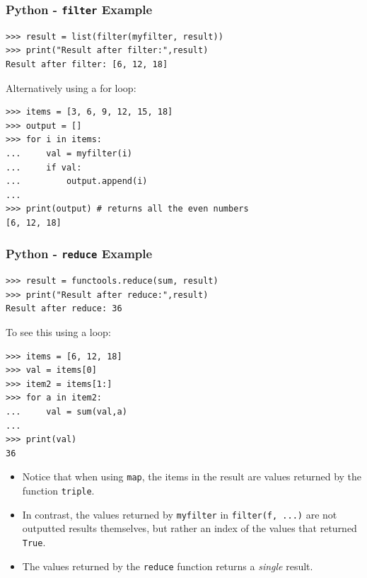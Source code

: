 \documentclass[xcolor=svgnames]{beamer}
\newcommand{\nl}{\\[1em]}
\newcommand{\ft}[1]{\frametitle{#1}}
\begin{document}
\begin{frame}[fragile]\ft{Python - {\tt filter} Example}
\begin{Verbatim}[xleftmargin=.1in, frame=single] 
>>> result = list(filter(myfilter, result))
>>> print("Result after filter:",result)
Result after filter: [6, 12, 18]
\end{Verbatim}
Alternatively using a for loop:
\begin{Verbatim}[xleftmargin=.1in, frame=single] 
>>> items = [3, 6, 9, 12, 15, 18]
>>> output = []
>>> for i in items:
...     val = myfilter(i)
...     if val:
...         output.append(i)
... 
>>> print(output) # returns all the even numbers
[6, 12, 18]
\end{Verbatim}
\end{frame}


\begin{frame}[fragile]\ft{Python - {\tt reduce} Example}
\begin{Verbatim}[xleftmargin=.1in, frame=single] 
>>> result = functools.reduce(sum, result)
>>> print("Result after reduce:",result)
Result after reduce: 36
\end{Verbatim}
To see this using a loop:
\begin{Verbatim}[frame=single]
>>> items = [6, 12, 18]
>>> val = items[0]
>>> item2 = items[1:]
>>> for a in item2:
...     val = sum(val,a)
... 
>>> print(val)
36
\end{Verbatim}
\end{frame}



\begin{frame}
\begin{itemize}
\item Notice that when using {\tt map}, the items in the result are values returned by the function {\tt triple}.\nl

\item In contrast, the values returned by {\tt myfilter} in {\tt filter(f, ...)} are not outputted results themselves, but rather an index of the values that returned {\tt True}.\nl

\item The values returned by the {\tt reduce} function returns a \textit{single} result.


\end{itemize}
\end{frame}
\end{document}
